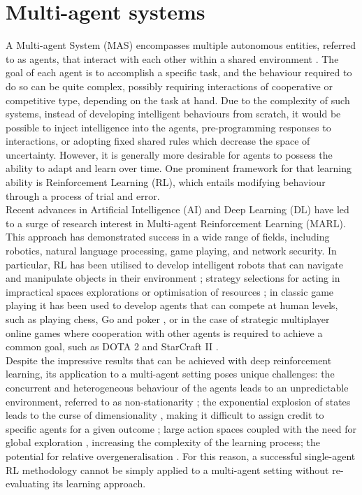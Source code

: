 \documentclass[a4paper,singleside,12pt]{report} %
\begin{document}
\section{Multi-agent systems}\label{multi-agent-systems}

A Multi-agent System (MAS) encompasses multiple autonomous entities, referred to as agents, that interact with each other within a shared environment \cite{weiss1999multiagent}. The goal of each agent is to accomplish a specific task, and the behaviour required to do so can be quite complex, possibly requiring interactions of cooperative or competitive type, depending on the task at hand. Due to the complexity of such systems, instead of developing intelligent behaviours from scratch, it would be possible to inject intelligence into the agents, pre-programming responses to interactions, or adopting fixed shared rules which decrease the space of uncertainty. However, it is generally more desirable for agents to possess the ability to adapt and learn over time. One prominent framework for that learning ability is Reinforcement Learning (RL), which entails modifying behaviour through a process of trial and error.\\
Recent advances in Artificial Intelligence (AI) and Deep Learning (DL) have led to a surge of research interest in Multi-agent Reinforcement Learning (MARL). This approach has demonstrated success in a wide range of fields, including robotics, natural language processing, game playing, and network security. In particular, RL has been utilised to develop intelligent robots that can navigate and manipulate objects in their environment \cite{Albrecht2017AutonomousAM}; strategy selections for acting in impractical spaces explorations \cite{Silva2019ASO} or optimisation of resources \cite{Mnih2015HumanlevelCT}; in classic game playing it has been used to develop agents that can compete at human levels, such as playing chess, Go and poker \cite{Silver2016MasteringTG, Silver2017MasteringTG, Brown2018SuperhumanAF}, or in the case of strategic multiplayer online games where cooperation with other agents is required to achieve a common goal, such as DOTA 2 \cite{OpenAI_dota} and StarCraft II \cite{Vinyals2019GrandmasterLI}.\\
Despite the impressive results that can be achieved with deep reinforcement learning, its application to a multi-agent setting poses unique challenges: the concurrent and heterogeneous behaviour of the agents leads to an unpredictable environment, referred to as non-stationarity \cite{Shoham2007IfML, Buoniu2008ACS, HernandezLeal2017ASO}; the exponential explosion of states leads to the curse of dimensionality \cite{Shoham2007IfML, Buoniu2008ACS}, making it difficult to assign credit to specific agents for a given outcome \cite{Wolpert2001OptimalPF, Agogino2004UnifyingTA}; large action spaces coupled with the need for global exploration \cite{Matignon2012IndependentRL}, increasing the complexity of the learning process; the potential for relative overgeneralisation \cite{Fulda2007PredictingAP, Wei2016LenientLI, Palmer2017LenientMD}. For this reason, a successful single-agent RL methodology cannot be simply applied to a multi-agent setting without re-evaluating its learning approach.
\end{document}
